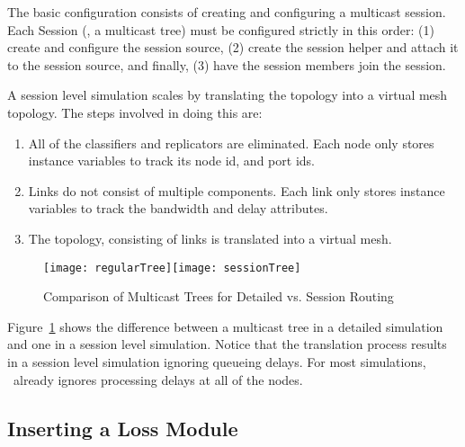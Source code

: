 The basic configuration consists of creating and configuring
a  multicast session.
Each Session (\ie, a multicast tree) must be configured strictly in
this order:
(1) create and configure the session source,
(2) create the session helper and attach it to the session source, and
finally, (3) have the session members join the session.
A session level simulation scales by translating the topology
into a virtual mesh topology.
The steps involved in doing this are:
\begin{enumerate}\itemsep0pt
\item All of the classifiers and replicators are eliminated.
  Each node only stores instance variables to track its node id, and port ids.
\item Links do not consist of multiple components.
  Each link only stores instance variables to track the bandwidth and delay attributes.
\item The topology, consisting of links is translated into a virtual mesh.
\end{enumerate}
\begin{figure}
  \centerline{\texttt{[image: regularTree]}\hfil\texttt{[image: sessionTree]}}
  \caption{Comparison of Multicast Trees for Detailed vs. Session Routing}
  \label{fig:conversions}
\end{figure}
Figure~\ref{fig:conversions} shows the difference between a
multicast tree in a detailed simulation and one in a session level simulation.
Notice that the translation process results in a session level simulation
ignoring queueing delays.
For most simulations, \ns\ already ignores processing delays at all of the nodes.

\subsection{Inserting a Loss Module}
\label{sec:loss-config}

